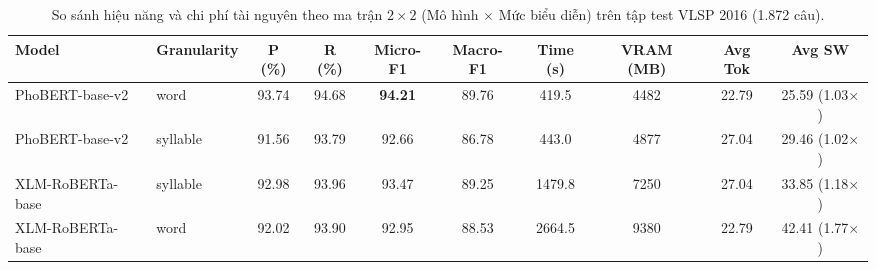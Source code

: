 \begin{table}[t]
\centering
\small
\begin{tabular}{llcccccccc}
\hline
\textbf{Model} & \textbf{Granularity} & \textbf{P (\%)} & \textbf{R (\%)} & \textbf{Micro-F1} & \textbf{Macro-F1} & \textbf{Time (s)} & \textbf{VRAM (MB)} & \textbf{Avg Tok} & \textbf{Avg SW} \\
\hline
PhoBERT-base-v2 & word & 93.74 & 94.68 & \textbf{94.21} & 89.76 & 419.5 & 4482 & 22.79 & 25.59 (1.03$\times$) \\
PhoBERT-base-v2 & syllable & 91.56 & 93.79 & 92.66 & 86.78 & 443.0 & 4877 & 27.04 & 29.46 (1.02$\times$) \\
XLM-RoBERTa-base & syllable & 92.98 & 93.96 & 93.47 & 89.25 & 1479.8 & 7250 & 27.04 & 33.85 (1.18$\times$) \\
XLM-RoBERTa-base & word & 92.02 & 93.90 & 92.95 & 88.53 & 2664.5 & 9380 & 22.79 & 42.41 (1.77$\times$) \\
\hline
\end{tabular}
\caption{So sánh hiệu năng và chi phí tài nguyên theo ma trận $2\times 2$ (Mô hình $\times$ Mức biểu diễn) trên tập test VLSP 2016 (1.872 câu).}
\label{tab:granularity-vlsp}
\end{table}

